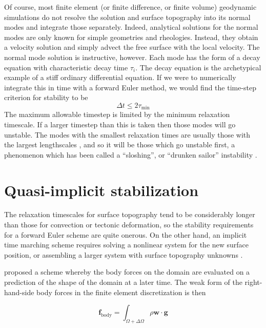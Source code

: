 \documentclass[preprint,12pt,authoryear]{elsarticle}
\begin{document}
Of course, most finite element (or finite difference, or finite volume) geodynamic simulations do not resolve 
the solution and surface topography into its normal modes and integrate those separately. 
Indeed, analytical solutions for the normal modes are only known for simple geometries and rheologies.
Instead, they obtain a velocity solution and simply advect the free surface with the local velocity.
The normal mode solution is instructive, however. 
Each mode has the form of a decay equation with characteristic decay time $\tau_i$.
The decay equation is the archetypical example of a stiff ordinary differential equation.
If we were to numerically integrate this in time with a forward Euler method, we would find the 
time-step criterion for stability \citep[e.g.][]{leveque2007finite} to be
\begin{equation}
\Delta t  \le 2 \tau_{\mathrm{min}}
\label{eq:cfl_euler}
\end{equation}
The maximum allowable timestep is limited by the minimum relaxation timescale.
If a larger timestep than this is taken then those modes will go unstable.
The modes with the smallest relaxation times are usually those with the largest lengthscales \citep{schubert2001mantle}, 
and so it will be those which go unstable first, a phenomenon which has been called 
a ``sloshing'', or ``drunken sailor'' instability \citep{kaus2010stabilization}.

\section{Quasi-implicit stabilization}
\label{sec:kmm}

The relaxation timescales for surface topography tend to be considerably longer than those for 
convection or tectonic deformation, so the stability requirements for a forward Euler scheme
are quite onerous.  On the other hand, an implicit time marching scheme requires solving 
a nonlinear system for the new surface position, or assembling a larger system with surface
topography unknowns \citep[e.g.][]{kramer2012implicit}.

\citet{kaus2010stabilization} proposed a scheme whereby the body forces on the domain are 
evaluated on a prediction of the shape of the domain at a later time.
The weak form of the right-hand-side body forces in the finite element discretization is then

\begin{equation}
\mathbf{f}_{\mathrm{body}} = \int_{\Omega + \Delta \Omega} \rho \mathbf{w} \cdot \mathbf{g}
\label{eq:predict}
\end{equation}
\end{document}

